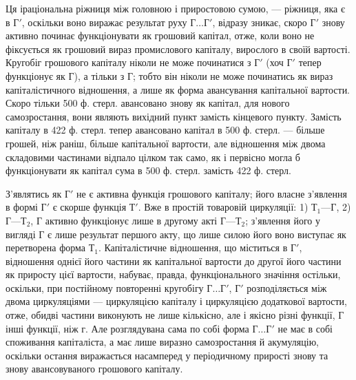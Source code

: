 Ця іраціональна ріжниця між головною і приростовою сумою, — ріжниця,
яка є в $Г'$, оскільки воно виражає результат руху $Г\dots{}Г'$, відразу зникає,
скоро $Г'$ знову активно починає функціонувати як грошовий капітал, отже,
коли воно не фіксується як грошовий вираз промислового капіталу, вирослого
в своїй вартості. Кругобіг грошового капіталу ніколи не може
починатися з $Г'$ (хоч $Г'$ тепер функціонує як $Г$), а тільки з $Г$; тобто
він ніколи не може починатись як вираз капіталістичного відношення, а
лише як форма авансування капітальної вартости. Скоро тільки 500 ф.
стерл. авансовано знову як капітал, для нового самозростання, вони
являють вихідний пункт замість кінцевого пункту. Замість капіталу в
422 ф. стерл. тепер авансовано капітал в 500 ф. стерл. — більше
грошей, ніж раніш, більше капітальної вартости, але відношення між
двома складовими частинами відпало цілком так само, як і первісно
могла б функціонувати як капітал сума в 500 ф. стерл. замість
422 ф. стерл.

З’являтись як $Г'$ не є активна функція грошового капіталу; його
власне з’явлення в формі $Г'$ є скорше функція $Т'$. Вже в простій товаровій
циркуляції: 1) $Т_1 — Г$, 2) $Г — Т_2$, $Г$ активно функціонує лише в
другому акті $Г — Т_2$; з’явлення його у вигляді $Г$ є лише результат першого
акту, що лише силою його воно виступає як перетворена форма
$Т_1$. Капіталістичне відношення, що міститься в $Г'$, відношення однієї його
частини як капітальної вартости до другої його частини як приросту
цієї вартости, набуває, правда, функціонального значіння остільки, оскільки,
при постійному повторенні кругобігу $Г\dots{}Г'$, $Г'$ розподіляється між двома
циркуляціями — циркуляцією капіталу і циркуляцією додаткової вартости,
отже, обидві частини виконують не лише кількісно, але і якісно
різні функції, $Г$ інші функції, ніж $г$. Але розглядувана сама по собі форма
$Г\dots{}Г'$ не має в собі споживання капіталіста, а має лише виразно
самозростання й акумуляцію, оскільки остання виражається насамперед
у періодичному прирості знову та знову авансовуваного грошового
капіталу.

